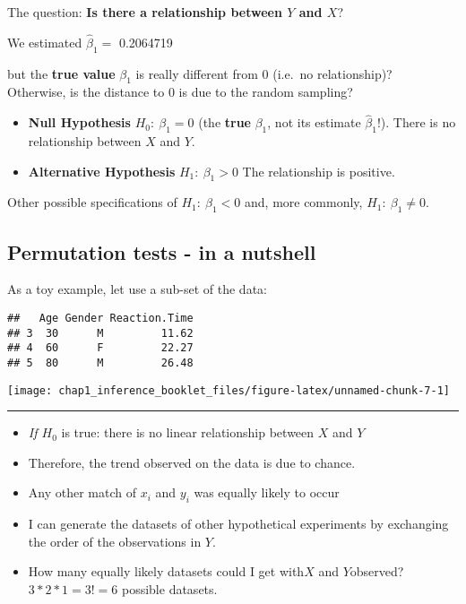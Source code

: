 \documentclass[]{article}
\providecommand{\tightlist}{%
  \setlength{\itemsep}{0pt}\setlength{\parskip}{0pt}}
\begin{document}
The question: \textbf{Is there a relationship between \(Y\) and \(X\)}?

We estimated \(\hat{\beta}_1=\) 0.2064719

but the \textbf{true value} \(\beta_1\) is really different from 0
(i.e.~no relationship)?\\
Otherwise, is the distance to 0 is due to the random sampling?

\begin{itemize}
\item
  \textbf{Null Hypothesis} \(H_0: \ \beta_1=0\) (the \textbf{true}
  \(\beta_1\), not its estimate \(\hat{\beta}_1\)!). There is no
  relationship between \(X\) and \(Y\).
\item
  \textbf{Alternative Hypothesis }\(H_1: \ \beta_1 >0\) The relationship
  is positive.
\end{itemize}

Other possible specifications of \(H_1: \ \beta_1< 0\) and, more
commonly, \(H_1: \ \beta_1 \neq 0\).

\subsection{Permutation tests - in a
nutshell}\label{permutation-tests---in-a-nutshell}

As a toy example, let use a sub-set of the data:

\begin{verbatim}
##   Age Gender Reaction.Time
## 3  30      M         11.62
## 4  60      F         22.27
## 5  80      M         26.48
\end{verbatim}

\begin{center}\texttt{[image: chap1\_inference\_booklet\_files/figure-latex/unnamed-chunk-7-1]} \end{center}

\begin{center}\rule{0.5\linewidth}{\linethickness}\end{center}

\begin{itemize}
\tightlist
\item
  \emph{If \(H_0\)} is true: there is no linear relationship between
  \(X\) and \(Y\)
\item
  Therefore, the trend observed on the data is due to chance.
\item
  Any other match of \(x_i\) and \(y_i\) was equally likely to occur
\item
  I can generate the datasets of other hypothetical experiments by
  exchanging the order of the observations in \(Y\).
\item
  How many equally likely datasets could I get with\(X\) and
  \(Y\)observed? \(3 * 2 * 1=3!=6\) possible datasets.
\end{itemize}
\end{document}
